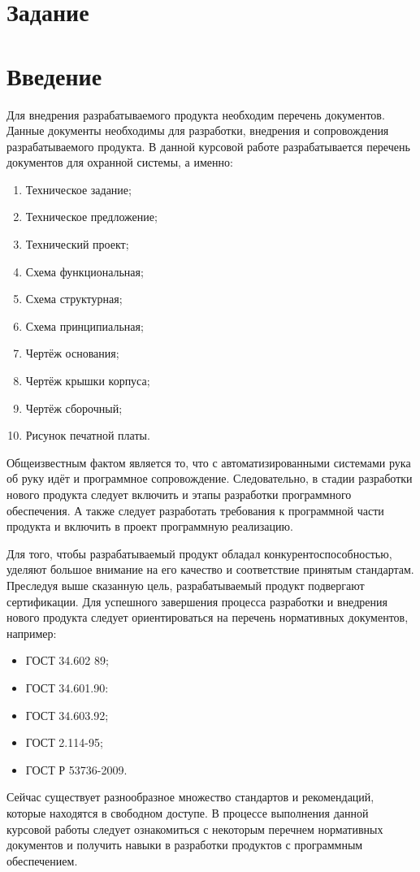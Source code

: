 \chapter*{Задание}

\chapter*{Введение}
Для внедрения разрабатываемого продукта необходим перечень документов.
Данные документы необходимы для разработки, внедрения и сопровождения разрабатываемого продукта.
В данной курсовой работе разрабатывается перечень документов для охранной системы, а именно:
\begin{enumerate}
	\item Техническое задание;
	\item Техническое предложение;
	\item Технический проект;
	\item Схема функциональная;
	\item Схема структурная;
	\item Схема принципиальная;
	\item Чертёж основания;
	\item Чертёж крышки корпуса;
	\item Чертёж сборочный;
	\item Рисунок печатной платы.
\end{enumerate}

Общеизвестным фактом является то, что с автоматизированными системами рука об руку идёт и программное сопровождение.
Следовательно, в стадии разработки нового продукта следует включить и этапы разработки программного обеспечения.
А также следует разработать требования к программной части продукта и включить в проект программную реализацию.

Для того, чтобы разрабатываемый продукт обладал конкурентоспособностью, уделяют большое внимание на его качество и соответствие принятым стандартам.
Преследуя выше сказанную цель, разрабатываемый продукт подвергают сертификации.
Для успешного завершения процесса разработки и внедрения нового продукта следует ориентироваться на перечень нормативных документов, например:
\begin{itemize}
	\item ГОСТ 34.602 89\cite{gost89};
	\item ГОСТ 34.601.90\cite{gost90}:
	\item ГОСТ 34.603.92\cite{gost92};
	\item ГОСТ 2.114-95\cite{gost95};
	\item ГОСТ Р 53736-2009\cite{gost09}.
\end{itemize}

Сейчас существует разнообразное множество стандартов и рекомендаций, которые находятся в свободном доступе.
В процессе выполнения данной курсовой работы следует ознакомиться с некоторым перечнем нормативных документов и получить 
навыки в разработки продуктов с программным обеспечением.
